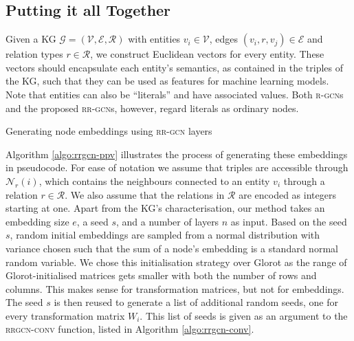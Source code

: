 \documentclass{llncs}
\begin{document}
\subsection{Putting it all Together}
Given a KG $\mathcal{G} = (\mathcal{V}, \mathcal{E}, \mathcal{R})$ with entities $v_i \in \mathcal{V}$, edges $(v_i, r, v_j) \in \mathcal{E}$ and relation types $r \in \mathcal{R}$, we construct Euclidean vectors for every entity. These vectors should encapsulate each entity's semantics, as contained in the triples of the KG, such that they can be used as features for machine learning models. 
Note that entities can also be ``literals'' and have associated values. Both \textsc{r-gcn}s and the proposed \textsc{rr-gcn}s, however, regard literals as ordinary nodes.

\begin{algorithm}[h]
\DontPrintSemicolon
{}
  \caption{Generating node embeddings using \textsc{rr-gcn} layers}\label{algo:rrgcn-ppv}
\end{algorithm}
\setlength{\textfloatsep}{5pt}
Algorithm \ref{algo:rrgcn-ppv} illustrates the process of generating these embeddings in pseudocode. For ease of notation we assume that triples are accessible through $\mathcal{N}_r(i)$, which contains the neighbours connected to an entity $v_i$ through a relation $r \in \mathcal{R}$. We also assume that the relations in $\mathcal{R}$ are encoded as integers starting at one. Apart from the KG's characterisation, our method takes an embedding size $e$, a seed $s$, and a number of layers $n$ as input. Based on the seed $s$, random initial embeddings are sampled from a normal distribution with variance chosen such that the sum of a node's embedding is a standard normal random variable. We chose this initialisation strategy over Glorot as the range of Glorot-initialised matrices gets smaller with both the number of rows and columns. This makes sense for transformation matrices, but not for embeddings.
The seed $s$ is then reused to generate a list of additional random seeds, one for every transformation matrix $W_i$. This list of seeds is given as an argument to the \textsc{rrgcn-conv} function, listed in Algorithm \ref{algo:rrgcn-conv}.
\end{document}
